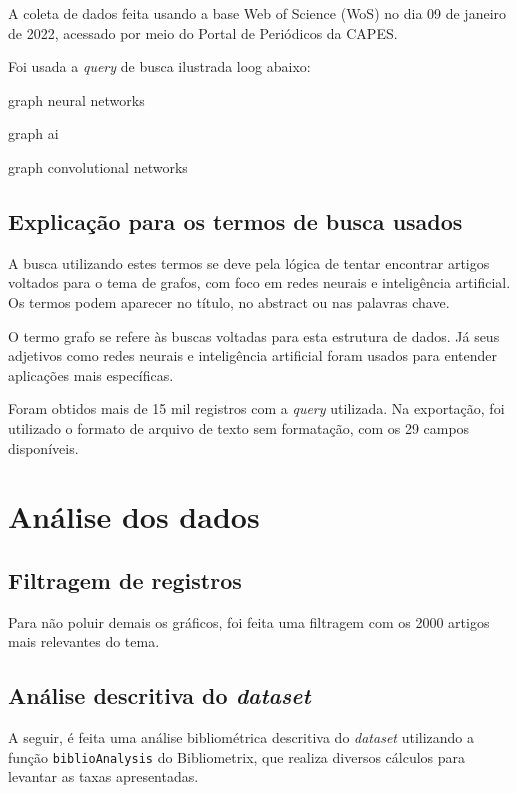 A coleta de dados feita usando a base Web of Science (WoS) no dia 09 de janeiro de 2022, acessado por meio do Portal de Periódicos da CAPES.

Foi usada a \textit{query} de busca ilustrada loog abaixo:
\begin{description}
    \item{graph neural networks}
    \item{graph ai}
    \item{graph convolutional networks}
\end{description}

\subsection{Explicação para os termos de busca usados\label{sec:tucazorron:query}}

A busca utilizando estes termos se deve pela lógica de tentar encontrar artigos voltados para o tema de grafos, com foco em redes neurais e inteligência artificial. Os termos podem aparecer no título, no abstract ou nas palavras chave.

O termo grafo se refere às buscas voltadas para esta estrutura de dados. Já seus adjetivos como redes neurais e inteligência artificial foram usados para entender aplicações mais específicas.

Foram obtidos mais de 15 mil registros com a \textit{query} utilizada. Na exportação, foi utilizado o formato de arquivo de texto sem formatação, com os 29 campos disponíveis.

\section{Análise dos dados}

\subsection{Filtragem de registros}

Para não poluir demais os gráficos, foi feita uma filtragem com os 2000 artigos mais relevantes do tema.

\subsection{Análise descritiva do \textit{dataset} }

A seguir, é feita uma análise bibliométrica descritiva do \textit{dataset} utilizando a função \texttt{biblioAnalysis} do Bibliometrix, que realiza diversos cálculos para levantar as taxas apresentadas.

